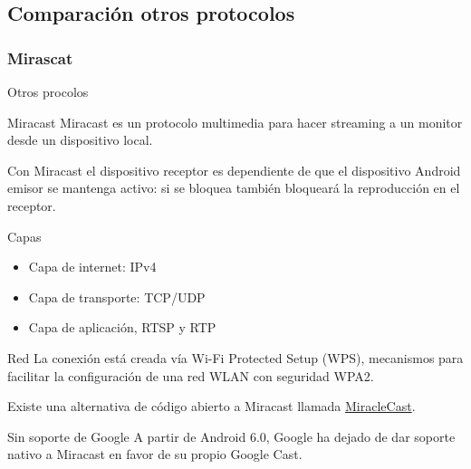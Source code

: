 \subsection{Comparación otros protocolos}

\subsubsection{Mirascat}

\begin{frame}{Otros procolos}
	\begin{block}{Miracast}
		Miracast es un protocolo multimedia para hacer streaming a un monitor desde un dispositivo local.

		Con Miracast el dispositivo receptor es dependiente de que el dispositivo Android emisor se mantenga activo: si se bloquea también bloqueará la reproducción en el receptor.
	\end{block}
	
	\begin{block}{Capas}
		\begin{itemize}
			\item Capa de internet: IPv4
			\item Capa de transporte: TCP/UDP
			\item Capa de aplicación, RTSP y RTP
		\end{itemize}
	\end{block}
\end{frame}

\begin{frame}
	\begin{block}{Red}
		La conexión está creada vía Wi-Fi Protected Setup
		(WPS), mecanismos para facilitar la configuración de
		una red WLAN con seguridad WPA2.
		
		Existe una alternativa de código abierto a Miracast llamada \href{https://github.com/albfan/miraclecast}{MiracleCast}.
	\end{block}
	
	\begin{alertblock}{Sin soporte de Google}
		A partir de Android 6.0, Google ha dejado de dar soporte nativo a Miracast en favor de su propio Google Cast.
	\end{alertblock}
\end{frame}
